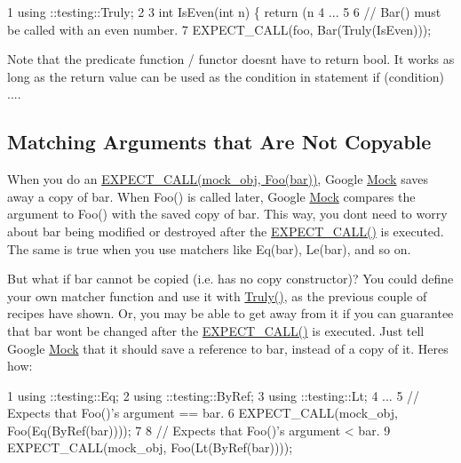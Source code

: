 \begin{DoxyCode}
1 using ::testing::Truly;
2 
3 int IsEven(int n) \{ return (n %
4 ...
5 
6   // Bar() must be called with an even number.
7   EXPECT\_CALL(foo, Bar(Truly(IsEven)));
\end{DoxyCode}


Note that the predicate function / functor doesn\textquotesingle{}t have to return {\ttfamily bool}. It works as long as the return value can be used as the condition in statement {\ttfamily if (condition) ...}.

\subsection*{Matching Arguments that Are Not Copyable}

When you do an {\ttfamily \hyperlink{gmock-spec-builders_8h_a535a6156de72c1a2e25a127e38ee5232}{E\+X\+P\+E\+C\+T\+\_\+\+C\+A\+L\+L(mock\+\_\+obj, Foo(bar))}}, Google \hyperlink{class_mock}{Mock} saves away a copy of {\ttfamily bar}. When {\ttfamily Foo()} is called later, Google \hyperlink{class_mock}{Mock} compares the argument to {\ttfamily Foo()} with the saved copy of {\ttfamily bar}. This way, you don\textquotesingle{}t need to worry about {\ttfamily bar} being modified or destroyed after the {\ttfamily \hyperlink{gmock-spec-builders_8h_a535a6156de72c1a2e25a127e38ee5232}{E\+X\+P\+E\+C\+T\+\_\+\+C\+A\+L\+L()}} is executed. The same is true when you use matchers like {\ttfamily Eq(bar)}, {\ttfamily Le(bar)}, and so on.

But what if {\ttfamily bar} cannot be copied (i.\+e. has no copy constructor)? You could define your own matcher function and use it with {\ttfamily \hyperlink{namespacetesting_a5faf05cfaae6074439960048e478b1c8}{Truly()}}, as the previous couple of recipes have shown. Or, you may be able to get away from it if you can guarantee that {\ttfamily bar} won\textquotesingle{}t be changed after the {\ttfamily \hyperlink{gmock-spec-builders_8h_a535a6156de72c1a2e25a127e38ee5232}{E\+X\+P\+E\+C\+T\+\_\+\+C\+A\+L\+L()}} is executed. Just tell Google \hyperlink{class_mock}{Mock} that it should save a reference to {\ttfamily bar}, instead of a copy of it. Here\textquotesingle{}s how\+:


\begin{DoxyCode}
1 using ::testing::Eq;
2 using ::testing::ByRef;
3 using ::testing::Lt;
4 ...
5   // Expects that Foo()'s argument == bar.
6   EXPECT\_CALL(mock\_obj, Foo(Eq(ByRef(bar))));
7 
8   // Expects that Foo()'s argument < bar.
9   EXPECT\_CALL(mock\_obj, Foo(Lt(ByRef(bar))));
\end{DoxyCode}


